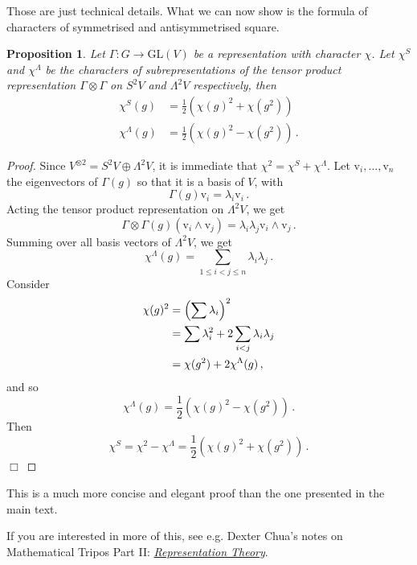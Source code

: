 \documentclass{article}
\theoremstyle{plain}\theoremheaderfont{\normalfont\itshape}\theorembodyfont{\rmfamily}\theoremseparator{.}\newtheorem*{rem}{Remark}\newtheorem*{ex}{Example}\newtheorem*{proof}{Proof}\newtheorem*{altp}{Alternative proof}
\theoremstyle{plain}\theoremheaderfont{\normalfont\bfseries}\theorembodyfont{\rmfamily}\theoremseparator{.}\newtheorem{thm}{Theorem}[section]\newtheorem{lem}[thm]{Lemma}\newtheorem{prop}[thm]{Proposition}\newtheorem*{cor}{Corollary}\newtheorem{defn}[thm]{Definition}\newtheorem{clm}[thm]{Claim}\newtheorem{clminproof}{Claim}\newtheorem*{law}{Law}\newtheorem{pos}[thm]{Postulate}
\theoremstyle{break}\theoremheaderfont{\normalfont\itshape}\theorembodyfont{\rmfamily}\theoremseparator{.\medskip}\newtheorem*{proofskip}{Proof}\newtheorem*{exs}{Examples}\newtheorem*{rems}{Remarks}
\theoremstyle{break}\theoremheaderfont{\normalfont\bfseries}\theorembodyfont{\rmfamily}\theoremseparator{.\medskip}\newtheorem{lemskip}[thm]{Lemma}\newtheorem{defnskip}[thm]{Definition}\newtheorem{propskip}[thm]{Proposition}\newtheorem{thmskip}[thm]{Theorem}
\numberwithin{equation}{section}
\newcommand{\qed}{\hfill\ensuremath{\Box}}
\newcommand{\vb}[1]{\bm{\mathrm{#1}}}
\newcommand{\GL}{\mathrm{GL}}
\begin{document}
    Those are just technical details. What we can now show is the formula of characters of symmetrised and antisymmetrised square.

    \begin{prop}
        Let \(\Gamma:G\to\GL(V)\) be a representation with character \(\chi\). Let \(\chi^S\) and \(\chi^\Lambda\) be the characters of subrepresentations of the tensor product representation \(\Gamma\otimes\Gamma\) on \(S^2V\) and \(\Lambda^2V\) respectively, then
        \begin{align}
            \chi^S(g)&=\frac{1}{2}(\chi(g)^2+\chi(g^2))\\
            \chi^\Lambda(g)&=\frac{1}{2}(\chi(g)^2-\chi(g^2))\,.
        \end{align}
    \end{prop}
    \begin{proof}
        Since \(V^{\otimes 2}=S^2V\oplus\Lambda^2V\), it is immediate that \(\chi^2=\chi^S+\chi^\Lambda\). Let \(\vb{v}_i,\dots,\vb{v}_n\) the eigenvectors of \(\Gamma(g)\) so that it is a basis of \(V\), with
        \begin{equation}
            \Gamma(g)\vb{v}_i=\lambda_i\vb{v}_i\,.
        \end{equation}
        Acting the tensor product representation on \(\Lambda^2 V\), we get
        \begin{equation}
            \Gamma\otimes\Gamma(g)(\vb{v}_i\wedge\vb{v}_j)=\lambda_i\lambda_j\vb{v}_i\wedge\vb{v}_j\,.
        \end{equation}
        Summing over all basis vectors of \(\Lambda^2 V\), we get
        \begin{equation}
            \chi^\Lambda(g)=\sum_{1\le i< j\le n}\lambda_i\lambda_j\,.
        \end{equation}
        Consider
        \begin{align}
            \chi(g)^2&=\left(\sum\lambda_i\right)^2\notag\\
            &=\sum\lambda_i^2+2\sum_{i<j}\lambda_i\lambda_j\notag\\
            &=\chi(g^2)+2\chi^\Lambda(g)\,,
        \end{align}
        and so
        \begin{equation}
            \chi^\Lambda(g)=\frac{1}{2}(\chi(g)^2-\chi(g^2))\,.
        \end{equation}
        Then
        \begin{equation}
            \chi^S=\chi^2-\chi^\Lambda=\frac{1}{2}(\chi(g)^2+\chi(g^2))\,.
        \end{equation}\qed
    \end{proof}
    This is a much more concise and elegant proof than the one presented in the main text.

    If you are interested in more of this, see e.g. Dexter Chua's notes on Mathematical Tripos Part II: \textcolor{blue}{\href{https://dec41.user.srcf.net/notes/II_L/representation_theory.pdf}{\textit{Representation Theory}}}.
\end{document}
